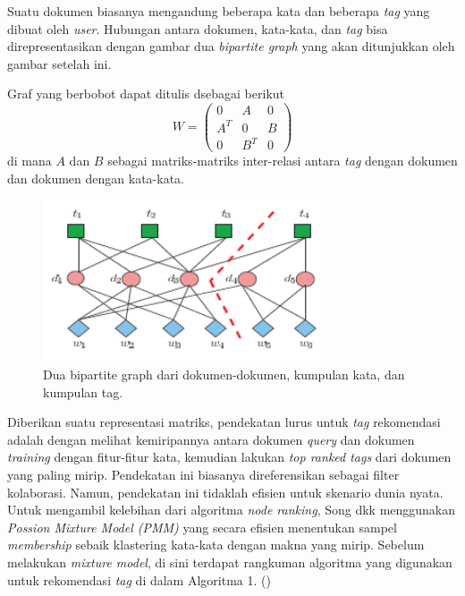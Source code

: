 Suatu dokumen biasanya mengandung beberapa kata dan beberapa \textit{tag} yang dibuat oleh \textit{user}. Hubungan antara dokumen, kata-kata, dan \textit{tag} bisa direpresentasikan dengan gambar dua \textit{bipartite graph} yang akan ditunjukkan oleh gambar setelah ini. 

Graf yang berbobot dapat ditulis dsebagai berikut
\begin{equation} \label{w_ab}
    W = \begin{pmatrix}
0 & A & 0\\
A^T & 0 & B\\
0 & B^T & 0
\end{pmatrix}
\end{equation}
di mana \(A\) dan \(B\) sebagai matriks-matriks inter-relasi antara \textit{tag} dengan dokumen dan dokumen dengan kata-kata.

\begin{figure}[H]
    \centering
    \includegraphics[width=0.75\textwidth]{gambar/Two Bipartite Graph of Tag Document Word.PNG}
    \caption{Dua bipartite graph dari dokumen-dokumen, kumpulan kata, dan kumpulan tag. \cite{song2008autotag}}
    \label{gambar:smoothed_ranking_function}
\end{figure}

Diberikan suatu representasi matriks, pendekatan lurus untuk \textit{tag} rekomendasi adalah dengan melihat kemiripannya antara dokumen \textit{query} dan dokumen \textit{training} dengan fitur-fitur kata, kemudian lakukan \textit{top ranked tags} dari dokumen yang paling mirip. Pendekatan ini biasanya direferensikan sebagai filter kolaborasi. Namun, pendekatan ini tidaklah efisien untuk skenario dunia nyata. Untuk mengambil kelebihan dari algoritma \textit{node ranking}, Song dkk menggunakan \textit{Possion Mixture Model (PMM)} yang secara efisien menentukan sampel \textit{membership} sebaik klastering kata-kata dengan makna yang mirip. Sebelum melakukan  \textit{mixture model}, di sini terdapat rangkuman algoritma yang digunakan untuk rekomendasi \textit{tag} di dalam Algoritma 1. (\cite{song2008autotag})

